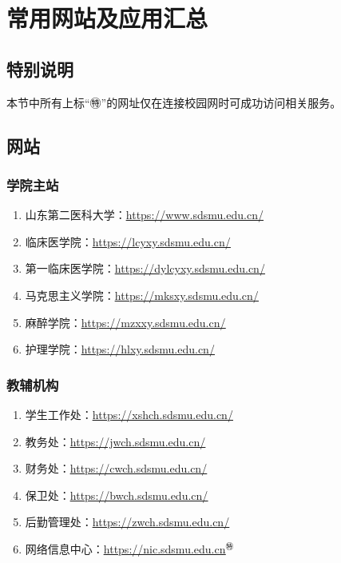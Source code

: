 \chapter[常用网站及应用汇总]{常用网站及应用汇总}

\section*{特别说明}
本节中所有上标“㊕”的网址仅在连接校园网时可成功访问相关服务。

\section[网站]{网站}
\subsection[学院主站]{学院主站}
\begin{enumerate}
    \item 山东第二医科大学：\uline{\href{https://www.sdsmu.edu.cn/}{https://www.sdsmu.edu.cn/}}
    \item 临床医学院：\uline{\href{https://lcyxy.sdsmu.edu.cn/}{https://lcyxy.sdsmu.edu.cn/}}
    \item 第一临床医学院：\uline{\href{https://dylcyxy.sdsmu.edu.cn/}{https://dylcyxy.sdsmu.edu.cn/}}
    \item 马克思主义学院：\uline{\href{https://mksxy.sdsmu.edu.cn/}{https://mksxy.sdsmu.edu.cn/}}
    \item 麻醉学院：\uline{\href{https://mzxxy.sdsmu.edu.cn/}{https://mzxxy.sdsmu.edu.cn/}}
    \item 护理学院：\uline{\href{https://hlxy.sdsmu.edu.cn/}{https://hlxy.sdsmu.edu.cn/}}
\end{enumerate}

\subsection[教辅机构]{教辅机构}
\begin{enumerate}
    \item 学生工作处：\uline{\href{https://xshch.sdsmu.edu.cn/}{https://xshch.sdsmu.edu.cn/}}
    \item 教务处：\uline{\href{https://jwch.sdsmu.edu.cn/}{https://jwch.sdsmu.edu.cn/}}
    \item 财务处：\uline{\href{https://cwch.sdsmu.edu.cn/}{https://cwch.sdsmu.edu.cn/}}
    \item 保卫处：\uline{\href{https://bwch.sdsmu.edu.cn/}{https://bwch.sdsmu.edu.cn/}}
    \item 后勤管理处：\uline{\href{https://zwch.sdsmu.edu.cn/}{https://zwch.sdsmu.edu.cn/}}
    \item 网络信息中心：\uline{\href{https://nic.sdsmu.edu.cn}{https://nic.sdsmu.edu.cn}$^㊕$}
\end{enumerate}

